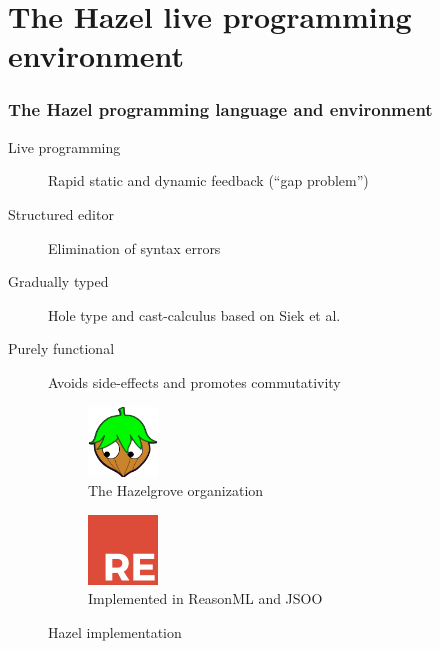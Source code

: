 \documentclass{beamer}
\begin{document}
\section{The Hazel live programming environment}

\begin{frame}
  \frametitle{The Hazel programming language and environment}

  \begin{description}
  \item[Live programming] Rapid static and dynamic feedback (``gap problem'')
  \item[Structured editor] Elimination of syntax errors
  \item[Gradually typed] Hole type and cast-calculus based on Siek et al. \cite{Siek06gradualtyping,siek2015refined}
  \item[Purely functional] Avoids side-effects and promotes commutativity
  \end{description}

  \begin{figure}
    \centering
    \begin{subfigure}[b]{0.5\textwidth}
      \centering
      \includegraphics[height=5em]{thesis/img/hazelgrove.png}
      \caption{The Hazelgrove organization}
    \end{subfigure}%
    \begin{subfigure}[b]{0.5\textwidth}
      \centering
      \includegraphics[height=5em]{thesis/img/reasonml.png}
      \caption{Implemented in ReasonML and JSOO}
    \end{subfigure}
    \caption{Hazel implementation}
  \end{figure}
\end{frame}
\end{document}
